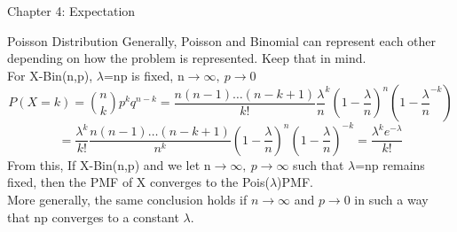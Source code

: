 \documentclass[a4paper, 12pt]{article}
\begin{document}
\begin{section}{Chapter 4: Expectation}
\begin{subsection}{Poisson Distribution}
Generally, Poisson and Binomial can represent each other depending on how the problem is represented. Keep that in mind.\\
For X-Bin(n,p), $\lambda$=np is fixed, n$\to\infty,~p\to 0$
\begin{equation} 
P(X=k)={n \choose k}p^{k}q^{n-k}=
\frac{n(n-1)\dots(n-k+1)}{k!}\frac{\lambda}{n}^{k}(1-\frac{\lambda}{n})^{n}(1-\frac{\lambda}{n}^{-k})
\end{equation}
\begin{equation} 
=\frac{\lambda^{k}}{k!}\frac{n(n-1)\dots(n-k+1)}{n^{k}}(1-\frac{\lambda}{n})^{n}(1-\frac{\lambda}{n})^{-k}=\frac{\lambda^{k}e^{-\lambda}}{k!}
\end{equation}
From this, If X-Bin(n,p) and we let n$\to\infty,~p\to\infty$ such that $\lambda$=np remains fixed, then the PMF of X converges to the Pois($\lambda$)PMF.\\
More generally, the same conclusion holds if $n\to\infty$ and $p\to 0$ in such a way that np converges to a constant $\lambda$.\\
\end{subsection}
\end{section}
\end{document}
